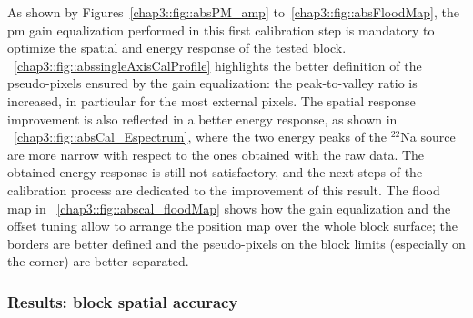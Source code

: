 As shown by Figures~\ref{chap3::fig::absPM_amp} to~\ref{chap3::fig::absFloodMap}, the \gls{pm} gain equalization performed in this first calibration step is mandatory to optimize the spatial and energy response of the tested block. \figurename~\ref{chap3::fig::abssingleAxisCalProfile} highlights the better definition of the pseudo-pixels ensured by the gain equalization: the peak-to-valley ratio is increased, in particular for the most external pixels. The spatial response improvement is also reflected in a better energy response, as shown in \figurename~\ref{chap3::fig::absCal_Espectrum}, where the two energy peaks of the $^{22}$Na source are more narrow with respect to the ones obtained with the raw data. The obtained energy response is still not satisfactory, and the next steps of the calibration process are dedicated to the improvement of this result. The flood map in \figurename~\ref{chap3::fig::abscal_floodMap} shows how the gain equalization and the offset tuning allow to arrange the position map over the whole block surface; the borders are better defined and the pseudo-pixels on the block limits (especially on the corner) are better separated. 


\subsubsection{Results: block spatial accuracy}\label{chap3::subsubsec::absBlockSpatialAcc}

